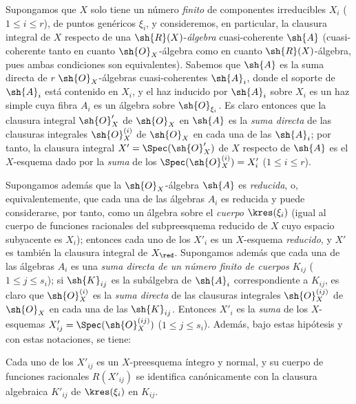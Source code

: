 \documentclass[oneside,10pt]{amsart}
\renewcommand{\leq}{\leqslant}
\newcommand{\oldpage}[2][]{\marginnote{\normalfont\footnotesize\textbf{#1}~|~#2}\ignorespaces}
\let\EGAOriginalLabel\label
\renewcommand{\label}[1]{\phantomsection\EGAOriginalLabel{#1}}
\begin{document}
\begin{env}[6.3.6]
\label{II.6.3.6}
Supongamos que $X$ solo tiene un número \emph{finito} de componentes irreducibles $X_i$ ($1\leq i\leq r$), de puntos genéricos $\xi_i$, y consideremos, en particular, la clausura integral de $X$ respecto de una $\sh{R}(X)$-\emph{álgebra} cuasi-coherente $\sh{A}$ (cuasi-coherente tanto en cuanto $\sh{O}_X$-álgebra como en cuanto $\sh{R}(X)$-álgebra, pues ambas condiciones son equivalentes).
Sabemos  que $\sh{A}$ es la suma directa de $r$ $\sh{O}_X$-álgebras cuasi-coherentes $\sh{A}_i$, donde el soporte de $\sh{A}_i$ está contenido en $X_i$, y el haz inducido por $\sh{A}_i$ sobre $X_i$ es un haz simple cuya fibra $A_i$ es un álgebra sobre $\sh{O}_{\xi_i}$.
Es claro entonces  que la clausura integral $\sh{O}'_X$ de $\sh{O}_X$ en $\sh{A}$ es la \emph{suma directa} de las clausuras integrales $\sh{O}_X^{(i)}$ de $\sh{O}_X$ en cada una de las $\sh{A}_i$; por tanto, la clausura integral $X'=\Spec(\sh{O}'_X)$ de $X$ respecto de $\sh{A}$ es el $X$-esquema dado por la \emph{suma} de los $\Spec(\sh{O}_X^{(i)})=X'_i$ ($1\leq i\leq r$).

Supongamos además que la $\sh{O}_X$-álgebra $\sh{A}$ es \emph{reducida}, o, equivalentemente, que cada una de las álgebras $A_i$ es reducida y puede considerarse, por tanto, como un álgebra sobre el \emph{cuerpo} $\kres(\xi_i)$ (igual al cuerpo de funciones racionales del subpreesquema reducido de $X$ cuyo espacio subyacente es $X_i$);
entonces  cada uno de los $X'_i$ es un $X$-esquema \emph{reducido}, y $X'$ es también la clausura integral de $X_\red$.
Supongamos además que cada una de las álgebras $A_i$ es una \emph{suma directa de un número finito de cuerpos $K_{ij}$} ($1\leq j\leq s_i$);
si $\sh{K}_{ij}$ es la subálgebra de $\sh{A}_i$ correspondiente a $K_{ij}$, es claro que $\sh{O}_X^{(i)}$ es la \emph{suma directa} de las clausuras integrales $\sh{O}_X^{(ij)}$ de $\sh{O}_X$ en cada una de las $\sh{K}_{ij}$.
Entonces $X'_i$ es la \emph{suma} de los $X$-esquemas $X'_{ij}=\Spec(\sh{O}_X^{(ij)})$ ($1\leq j\leq s_i$).
Además, bajo estas hipótesis y con estas notaciones, se tiene:
\end{env}

\oldpage[II]{119}
\begin{proposition}[6.3.7]
\label{II.6.3.7}
Cada uno de los $X'_{ij}$ es un $X$-preesquema íntegro y normal, y su cuerpo de funciones racionales $R(X'_{ij})$ se identifica canónicamente con la clausura algebraica $K'_{ij}$ de $\kres(\xi_i)$ en $K_{ij}$.
\end{proposition}
\end{document}
